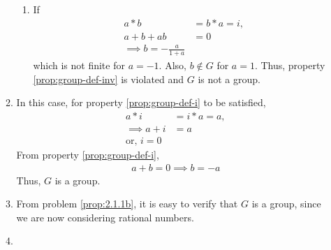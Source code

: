 \begin{enumerate}[label=\arabic*.,ref=\thesubsection.\theenumi]
\begin{enumerate}
\begin{enumerate}
	\item   If
		\begin{align}
			a*b &= b*a  = i, 
			\\
			a+b+ab &= 0
			\\
			\implies b = -\frac{a}{1+a}
		\end{align}
		which  is not finite for $a = -1$.  Also, $b \notin G$ for $a = 1$.  Thus, property 
		\ref{prop:group-def-inv} is violated and $G$ is not a group.

\end{enumerate}
	\item In this case, for 
		property
		\ref{prop:group-def-i} to be satisfied,
		\begin{align}
			a*i &= i*a = a, 
			\\
			\implies 
			a+i &=a 
			\\
			\text{or, } i = 0
		\end{align}
From property
		\ref{prop:group-def-i},
		\begin{align}
a+b = 0 \implies b = -a
		\end{align}
		Thus, $G$ is a group.
	\item From problem 
		\ref{prop:2.1.1b}, it is easy to verify that $G$ is a group, since we are now considering rational numbers.
	\item 

\end{enumerate}
\end{enumerate}
